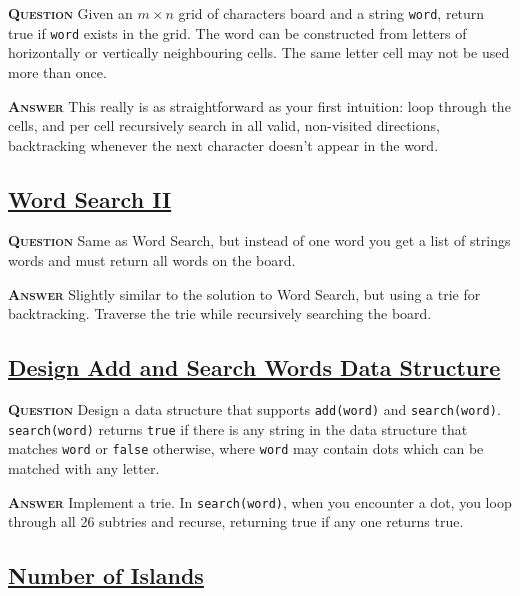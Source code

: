 \documentclass[table, xcdraw]{article}%
\begin{document}
\textsc{\textbf{Question}} Given an $m \times n$ grid of characters board and a string \texttt{word}, return true if \texttt{word} exists in the grid. The word can be constructed from letters of horizontally or vertically neighbouring cells. The same letter cell may not be used more than once.

\textsc{\textbf{Answer}} This really is as straightforward as your first intuition: loop through the cells, and per cell recursively search in all valid, non-visited directions, backtracking whenever the next character doesn't appear in the word.

\subsection{\href{https://leetcode.com/problems/word-search-ii}{Word Search II}}

\textsc{\textbf{Question}} Same as Word Search, but instead of one word you get a list of strings words and must return all words on the board.

\textsc{\textbf{Answer}} Slightly similar to the solution to Word Search, but using a trie for backtracking. Traverse the trie while recursively searching the board.

\subsection{\href{https://leetcode.com/problems/design-add-and-search-words-data-structure}{Design Add and Search Words Data Structure}}

\textsc{\textbf{Question}} Design a data structure that supports \texttt{add(word)} and \texttt{search(word)}. \texttt{search(word)} returns \texttt{true} if there is any string in the data structure that matches \texttt{word} or \texttt{false} otherwise, where \texttt{word} may contain dots which can be matched with any letter.

\textsc{\textbf{Answer}} Implement a trie. In \texttt{search(word)}, when you encounter a dot, you loop through all 26 subtries and recurse, returning true if any one returns true.

\subsection{\href{https://leetcode.com/problems/number-of-islands}{Number of Islands}}
\end{document}
